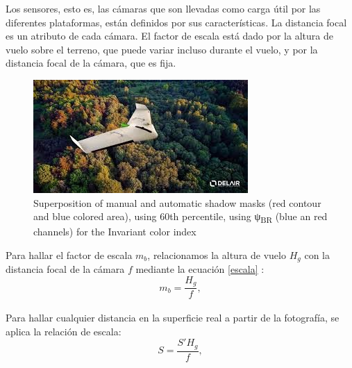 Los sensores, esto es, las cámaras que son llevadas como carga útil por las diferentes plataformas, están definidos por sus características. La distancia focal es un atributo de cada cámara. El factor de escala está dado por la altura de vuelo sobre el terreno, que puede variar incluso durante el vuelo, y por la distancia focal de la cámara, que es fija. 
\begin{figure}
    \includegraphics[width=\textwidth]{Imagenes/dron.jpg}
     \hfill
     \caption{Superposition of manual and automatic shadow masks (red contour and blue colored area), using 60th percentile, using ψ\textsubscript{BR} (blue an red channels) for the Invariant color index}
    \label{dron}
\end{figure}
Para hallar el factor de escala $m_b$, relacionamos la altura de vuelo $H_g$ con la distancia focal
de la cámara $f$ mediante la ecuación \ref{escala} \cite{linder_digital_2016}:
\\
\begin{equation}
	m_b=\frac{H_g}{f},\label{escala}
\end{equation}
\\
Para hallar cualquier distancia en la superficie real a partir de la fotografía, se aplica la relación de escala:
\\
\begin{equation}
	S=\frac{S'H_g}{f},\label{escala1}
\end{equation}
\\
